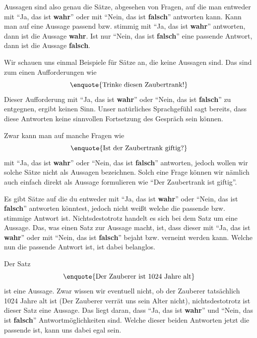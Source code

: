 \documentclass[../../main.tex]{subfiles}
\begin{document}
    Aussagen sind also genau die Sätze, abgesehen von Fragen, auf die man entweder mit \enquote{Ja, das ist \textbf{wahr}} oder mit \enquote{Nein, das ist \textbf{falsch}} antworten kann. Kann man auf eine Aussage passend bzw. stimmig mit \enquote{Ja, das ist \textbf{wahr}} antworten, dann ist die Aussage \textbf{wahr}. Ist nur \enquote{Nein, das ist \textbf{falsch}} eine passende Antwort, dann ist die Aussage \textbf{falsch}.

    \begin{example}{}
        Wir schauen uns einmal Beispiele für Sätze an, die keine Aussagen sind. Das sind zum einen Aufforderungen wie
        \[\textrm{\enquote{Trinke diesen Zaubertrank!}}\]
        Dieser Aufforderung mit \enquote{Ja, das ist \textbf{wahr}} oder \enquote{Nein, das ist \textbf{falsch}} zu entgegnen, ergibt keinen Sinn. Unser natürliches Sprachgefühl sagt bereits, dass diese Antworten keine sinnvollen Fortsetzung des Gespräch sein können.
        
        Zwar kann man auf manche Fragen wie
         \[\textrm{\enquote{Ist der Zaubertrank giftig?}}\]
        mit \enquote{Ja, das ist \textbf{wahr}} oder \enquote{Nein, das ist \textbf{falsch}} antworten, jedoch wollen wir solche Sätze nicht als Aussagen bezeichnen. Solch eine Frage können wir nämlich auch einfach direkt als Aussage formulieren wie
        \enquote{Der Zaubertrank ist giftig}.
    \end{example}

    Es gibt Sätze auf die du entweder mit \enquote{Ja, das ist \textbf{wahr}} oder \enquote{Nein, das ist \textbf{falsch}} antworten könntest, jedoch nicht weißt welche die passende bzw. stimmige Antwort ist. Nichtsdestotrotz handelt es sich bei dem Satz um eine Aussage. Das, was einen Satz zur Aussage macht, ist, dass dieser mit \enquote{Ja, das ist \textbf{wahr}} oder mit \enquote{Nein, das ist \textbf{falsch}} bejaht bzw. verneint werden kann. Welche nun die passende Antwort ist, ist dabei belanglos.
   
   \begin{example}{}
        Der Satz 
        \[\textrm{\enquote{Der Zauberer ist 1024 Jahre alt}}\]
        ist eine Aussage. Zwar wissen wir eventuell nicht, ob der Zauberer tatsächlich 1024 Jahre alt ist (Der Zauberer verrät uns sein Alter nicht), nichtsdestotrotz ist dieser Satz eine Aussage. Das liegt daran, dass \enquote{Ja, das ist \textbf{wahr}} und  \enquote{Nein, das ist \textbf{falsch}} Antwortmöglichkeiten sind. Welche dieser beiden Antworten jetzt die passende ist, kann uns dabei egal sein.
   \end{example}
\end{document}
